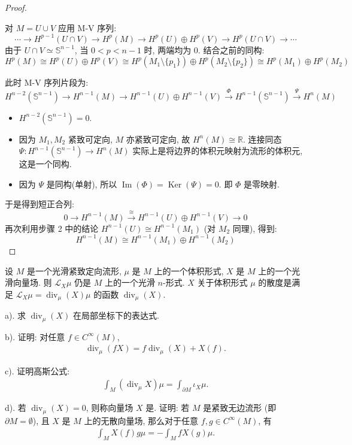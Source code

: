 \documentclass[../main.tex]{subfiles}
\begin{document}
\begin{proof}
\begin{itemize}
\end{itemize}
对 $M = U \cup V$ 应用 M-V 序列:
$$\cdots \to H^{p-1}(U \cap V) \to H^p(M) \to H^p(U) \oplus H^p(V) \to H^p(U \cap V) \to \cdots$$
由于 $U \cap V \simeq \mathbb{S}^{n-1}$, 当 $0 < p < n-1$ 时, 两端均为 $0$. 结合之前的同构:
$$H^p(M) \cong H^p(U) \oplus H^p(V) \cong H^p(M_1 \setminus \{p_1\}) \oplus H^p(M_2 \setminus \{p_2\}) \cong H^p(M_1) \oplus H^p(M_2)$$

此时 M-V 序列片段为:
$$H^{n-2}(\mathbb{S}^{n-1}) \to H^{n-1}(M) \to H^{n-1}(U) \oplus H^{n-1}(V) \xrightarrow{\Phi} H^{n-1}(\mathbb{S}^{n-1}) \xrightarrow{\Psi} H^n(M)$$
\begin{itemize}
    \item $H^{n-2}(\mathbb{S}^{n-1}) = 0$.
    \item 因为 $M_1, M_2$ 紧致可定向, $M$ 亦紧致可定向, 故 $H^n(M) \cong \mathbb{R}$. 连接同态 $\Psi: H^{n-1}(\mathbb{S}^{n-1}) \to H^n(M)$ 实际上是将边界的体积元映射为流形的体积元, 这是一个同构.
    \item 因为 $\Psi$ 是同构(单射), 所以 $\operatorname{Im}(\Phi) = \operatorname{Ker}(\Psi) = 0$. 即 $\Phi$ 是零映射.

\end{itemize}
于是得到短正合列:
$$0 \to H^{n-1}(M) \xrightarrow{\cong} H^{n-1}(U) \oplus H^{n-1}(V) \to 0$$
再次利用步骤 2 中的结论 $H^{n-1}(U) \cong H^{n-1}(M_1)$ (对 $M_2$ 同理), 得到:
$$H^{n-1}(M) \cong H^{n-1}(M_1) \oplus H^{n-1}(M_2)$$
\end{proof}
\begin{exercise}{}{}
设 $M$ 是一个光滑紧致定向流形, $\mu$ 是 $M$ 上的一个体积形式, $X$ 是 $M$ 上的一个光滑向量场. 则 $\mathcal{L}_X\mu$ 仍是 $M$ 上的一个光滑 $n$-形式. $X$ 关于体积形式 $\mu$ 的散度是满足 $\mathcal{L}_X\mu=\operatorname{div}_\mu(X)\mu$ 的函数 $\operatorname{div}_\mu(X)$.

a). 求 $\operatorname{div}_\mu(X)$ 在局部坐标下的表达式.

b). 证明: 对任意 $f\in C^\infty(M)$,
$$\begin{aligned}\operatorname{div}_\mu(fX)=f\operatorname{div}_\mu(X)+X(f).\end{aligned}$$

c). 证明高斯公式:
$$\begin{aligned}\int_M(\operatorname{div}_\mu X)\mu=\int_{\partial M}\iota_X\mu.\end{aligned}$$

d). 若 $\operatorname{div}_\mu(X)=0$, 则称向量场 $X$ 是. 证明: 若 $M$ 是紧致无边流形 (即 $\partial M=\emptyset$), 且 $X$ 是 $M$ 上的无散向量场, 那么对于任意 $f,g\in C^\infty(M)$, 有
$$\begin{aligned}\int_M X(f)g\mu=-\int_M fX(g)\mu.\end{aligned}$$
\end{exercise}
\end{document}
